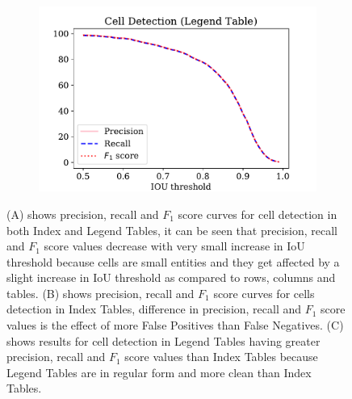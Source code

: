 \begin{figure}[h!]
\begin{subfigure}{0.325\linewidth}
    \caption{}
    \label{}
\end{subfigure}
\begin{subfigure}{0.325\linewidth}
  \centering
  \includegraphics[width=\linewidth]{cell_legend_pRf.pdf}
    \caption{}
    \label{}
\end{subfigure}
\caption{(A) shows precision, recall and $F_1$ score curves for cell detection in both Index and Legend Tables, it can be seen that precision, recall and $F_1$ score values decrease with very small increase in IoU threshold because cells are small entities and they get affected by a slight increase in IoU threshold as compared to rows, columns and tables. (B) shows precision, recall and $F_1$ score curves for cells detection in Index Tables, difference in precision, recall and $F_1$ score values is the effect of more False Positives than False Negatives. (C) shows results for cell detection in Legend Tables having greater precision, recall and $F_1$ score values than Index Tables because Legend Tables are in regular form and more clean than Index Tables.}
\label{fig:cell_graph}
\end{figure}
